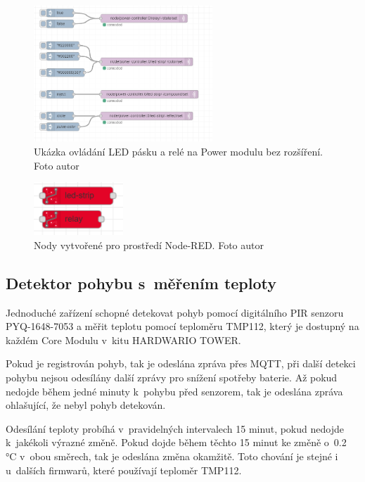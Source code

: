 \begin{figure}[H]
  \centering
  \includegraphics[width=0.6\textwidth]{obrazky-figures/flows/powerModuleFlowShowcase.PNG}
  \caption{Ukázka ovládání LED pásku a relé na Power modulu bez rozšíření. Foto autor}
  \label{nodeRedPowerModule}
\end{figure}

\begin{figure}[H]
  \centering
  \includegraphics[width=0.3\textwidth]{obrazky-figures/flows/customNodeRedNodes.PNG}
  \caption{Nody vytvořené pro prostředí Node-RED. Foto autor}
  \label{nodeRedCustomNode}
\end{figure}

\subsection*{Detektor pohybu s~měřením teploty} \label{movement-with-tmp112}
Jednoduché zařízení schopné detekovat pohyb pomocí digitálního PIR senzoru PYQ-1648-7053 a měřit teplotu pomocí teploměru TMP112, který je dostupný na každém Core Modulu v~kitu HARDWARIO TOWER.

Pokud je registrován pohyb, tak je odeslána zpráva přes MQTT, při další detekci pohybu nejsou odesílány další zprávy pro snížení spotřeby baterie. Až pokud nedojde během jedné minuty k~pohybu před senzorem, tak je odeslána zpráva ohlašující, že nebyl pohyb detekován.

Odesílání teploty probíhá v~pravidelných intervalech 15 minut, pokud nedojde k~jakékoli výrazné změně. Pokud dojde během těchto 15 minut ke změně o~0.2 °C v~obou směrech, tak je odeslána změna okamžitě. Toto chování je stejné i u~dalších firmwarů, které používají teploměr TMP112.


